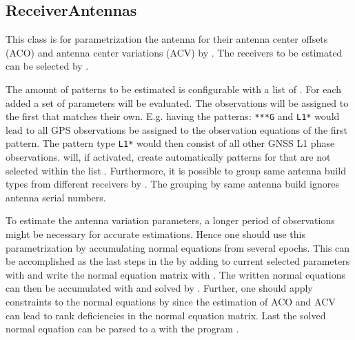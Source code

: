 \subsection{ReceiverAntennas}\label{gnssParametrizationType:receiverAntennas}
This class is for parametrization the antenna for their antenna center offsets (ACO) and
antenna center variations (ACV) by .
The receivers to be estimated can be selected by .

The amount of patterns to be estimated is configurable with a list of .
For each added  a set of parameters will be evaluated. The observations
will be assigned to the first  that matches their own.
E.g. having the patterns: \verb|***G| and \verb|L1*| would lead to all GPS observations be assigned
to the observation equations of the first pattern. The pattern type \verb|L1*| would then consist
of all other GNSS L1 phase observations.  will, if activated, create automatically patterns
for  that are not selected within the list .
Furthermore, it is possible to group same antenna build types from different receivers by .
The grouping by same antenna build ignores antenna serial numbers.

To estimate the antenna variation parameters, a longer period of observations might be necessary
for accurate estimations. Hence one should use this parametrization by
accumulating normal equations from several epochs.
This can be accomplished as the last steps in the 
 by adding 
to current selected parameters with 
and write the normal equation matrix with .
The written normal equations can then be accumulated with  and solved by .
Further, one should apply constraints to the normal equations by  since the estimation
 of ACO and ACV can lead to rank deficiencies in the normal equation matrix.
Last the solved normal equation can be parsed to a 
 with the program .

